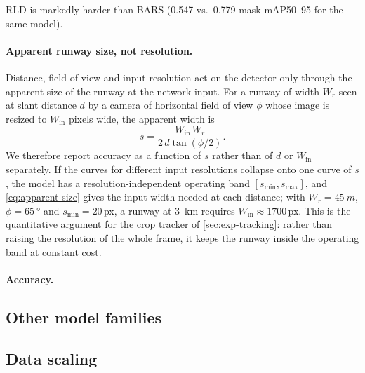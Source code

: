 RLD is markedly harder than BARS (0.547 vs.\ 0.779 mask mAP50--95 for the same model). 

\paragraph{Apparent runway size, not resolution.}
Distance, field of view and input resolution act on the detector only through the apparent size of the runway at the network input.
For a runway of width $W_r$ seen at slant distance $d$ by a camera of horizontal field of view $\phi$ whose image is resized to $W_\text{in}$ pixels wide, the apparent width is
\begin{equation}
s = \frac{W_\text{in}\, W_r}{2\, d \tan(\phi/2)}.
\label{eq:apparent-size}
\end{equation}
We therefore report accuracy as a function of $s$ rather than of $d$ or $W_\text{in}$ separately.
If the curves for different input resolutions collapse onto one curve of $s$, the model has a resolution-independent operating band $[s_\text{min}, s_\text{max}]$, and \cref{eq:apparent-size} gives the input width needed at each distance; with $W_r=\SI{45}{m}$, $\phi=\SI{65}{\degree}$ and $s_\text{min}=20$\,px, a runway at \SI{3}{km} requires $W_\text{in}\approx1700$\,px.
This is the quantitative argument for the crop tracker of \cref{sec:exp-tracking}: rather than raising the resolution of the whole frame, it keeps the runway inside the operating band at constant cost. 

\paragraph{Accuracy.}

\subsection{Other model families}

\subsection{Data scaling}
